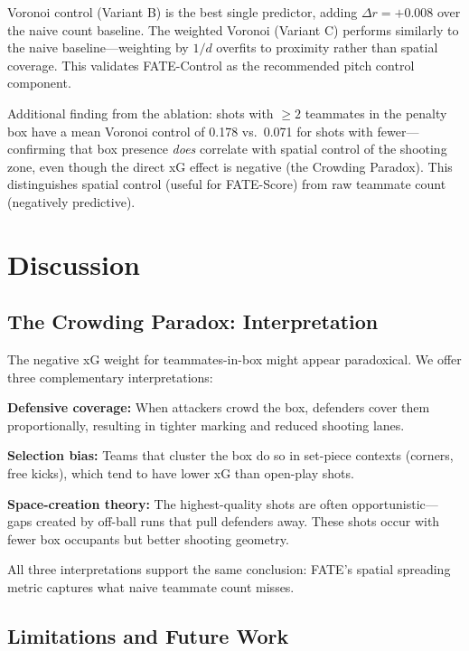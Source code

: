 \documentclass[10pt,twocolumn]{article}
\begin{document}
Voronoi control (Variant B) is the best single predictor, adding $\Delta r = +0.008$ over the naive count baseline. The weighted Voronoi (Variant C) performs similarly to the naive baseline—weighting by $1/d$ overfits to proximity rather than spatial coverage. This validates FATE-Control as the recommended pitch control component.

Additional finding from the ablation: shots with $\geq 2$ teammates in the penalty box have a mean Voronoi control of 0.178 vs.\ 0.071 for shots with fewer—confirming that box presence \emph{does} correlate with spatial control of the shooting zone, even though the direct xG effect is negative (the Crowding Paradox). This distinguishes spatial control (useful for FATE-Score) from raw teammate count (negatively predictive).

\section{Discussion}
\label{sec:discussion}

\subsection{The Crowding Paradox: Interpretation}

The negative xG weight for teammates-in-box might appear paradoxical. We offer three complementary interpretations:

\textbf{Defensive coverage:} When attackers crowd the box, defenders cover them proportionally, resulting in tighter marking and reduced shooting lanes.

\textbf{Selection bias:} Teams that cluster the box do so in set-piece contexts (corners, free kicks), which tend to have lower xG than open-play shots.

\textbf{Space-creation theory:} The highest-quality shots are often opportunistic—gaps created by off-ball runs that pull defenders away. These shots occur with fewer box occupants but better shooting geometry.

All three interpretations support the same conclusion: FATE's spatial spreading metric captures what naive teammate count misses.

\subsection{Limitations and Future Work}
\end{document}
